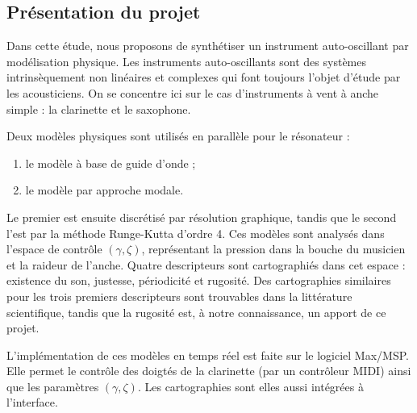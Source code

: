 \documentclass[french, twocolumn]{article}
\begin{document}
\subsection{Présentation du projet}

Dans cette étude, nous proposons de synthétiser un instrument auto-oscillant par modélisation physique. 
Les instruments auto-oscillants sont des systèmes intrinsèquement non linéaires et complexes qui font toujours l'objet d'étude par les acousticiens. On se concentre ici sur le cas d'instruments à vent à anche simple : la clarinette et le saxophone. 

Deux modèles physiques sont utilisés en parallèle pour le résonateur : 
\begin{enumerate}
    \item le modèle à base de guide d'onde ;
    \item le modèle par approche modale.
\end{enumerate} Le premier est ensuite discrétisé par résolution graphique, tandis que le second l'est par la méthode Runge-Kutta d'ordre 4. Ces modèles sont analysés dans l'espace de contrôle $(\gamma, \zeta)$, représentant la pression dans la bouche du musicien et la raideur de l'anche. Quatre descripteurs sont cartographiés dans cet espace : existence du son, justesse, périodicité et rugosité. Des cartographies similaires pour les trois premiers descripteurs sont trouvables dans la littérature scientifique\cite{doc2014minimal}\cite{missoum_explicit_2014}, tandis que la rugosité est, à notre connaissance, un apport de ce projet. 

L'implémentation de ces modèles en temps réel est faite sur le logiciel Max/MSP. Elle permet le contrôle des doigtés de la clarinette (par un contrôleur MIDI) ainsi que les paramètres $(\gamma, \zeta)$. Les cartographies sont elles aussi intégrées à l'interface.




\end{document}
